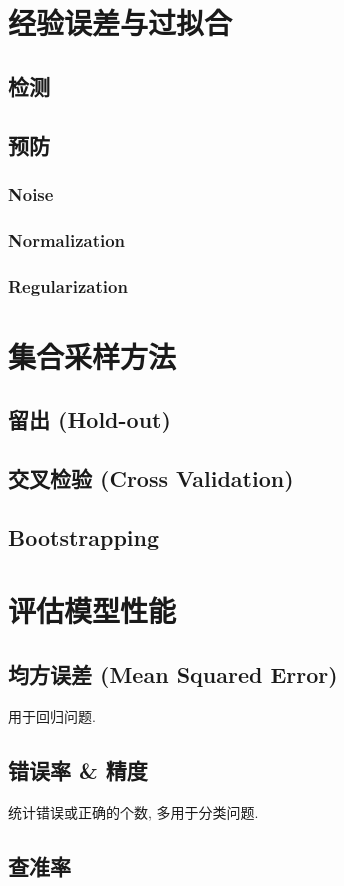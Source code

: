 \documentclass[oneside]{book}
\begin{document}
		\section{经验误差与过拟合}
			\subsection{检测}
			\subsection{预防}
				\subsubsection{Noise}
				\subsubsection{Normalization}
				\subsubsection{Regularization}
		\section{集合采样方法}
			\subsection{留出 (Hold-out)}
			\subsection{交叉检验 (Cross Validation)}
			\subsection{Bootstrapping}
		\section{评估模型性能}
			\subsection{均方误差 (Mean Squared Error)}
				用于回归问题.
			\subsection{错误率 \& 精度}
				统计错误或正确的个数, 多用于分类问题.
			\subsection{查准率}
\end{document}
